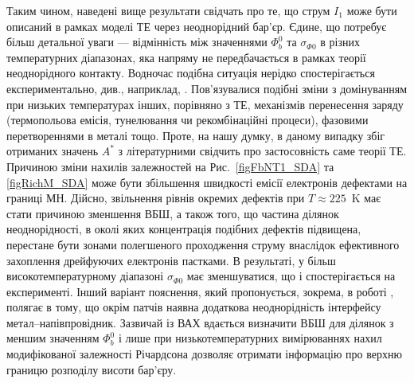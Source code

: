 Таким чином, наведені вище результати свідчать про те, що струм $I_1$ може бути описаний в рамках моделі ТЕ через неоднорідний бар'єр.
Єдине, що потребує більш детальної уваги --- відмінність між значеннями $\Phi_b^0$ та  $\sigma_{\Phi0}$ в різних температурних діапазонах,
яка напряму не передбачається в рамках теорії неоднорідного контакту.
Водночас подібна ситуація нерідко спостерігається експериментально, див., наприклад,
\cite{Tascioglu2010old,Yildirim2010,Mamor,Jiang:DGJap,JYOTHI2015,DURMUS2014,KHURE2015,OZAVCI2013,Tung:ApplPhysRev}.
Пов'язувалися подібні зміни  з домінуванням при низьких температурах інших, порівняно з ТЕ, механізмів перенесення заряду
(термопольова емісія, тунелювання чи рекомбінаційні процеси), фазовими перетвореннями в металі тощо.
Проте, на нашу думку, в даному випадку збіг  отриманих значень $A^*$ з літературними свідчить про застосовність саме теорії ТЕ.
Причиною зміни нахилів залежностей на Рис.~\ref{figFbNT1_SDA} та \ref{figRichM_SDA} може бути збільшення швидкості емісії електронів дефектами на границі МН.
Дійсно, звільнення рівнів окремих дефектів при $T\approx225$~K має стати причиною зменшення ВБШ, а також того,
що частина ділянок неоднорідності, в околі яких концентрація подібних дефектів підвищена, перестане бути зонами полегшеного проходження струму внаслідок ефективного захоплення дрейфуючих електронів пастками.
В результаті, у більш високотемпературному діапазоні $\sigma_{\Phi0}$ має зменшуватися, що і спостерігається на експерименті.
Інший варіант пояснення, який пропонується, зокрема, в роботі \cite{Tung:ApplPhysRev},
полягає в тому, що окрім патчів наявна додаткова неоднорідність інтерфейсу метал--напівпровідник.
Зазвичай із ВАХ вдається визначити ВБШ для ділянок з меншим значенням $\Phi_b^0$ і лише при низькотемпературних вимірюваннях
нахил модифікованої залежності Річардсона дозволяє отримати інформацію про верхню границю розподілу висоти бар'єру.


